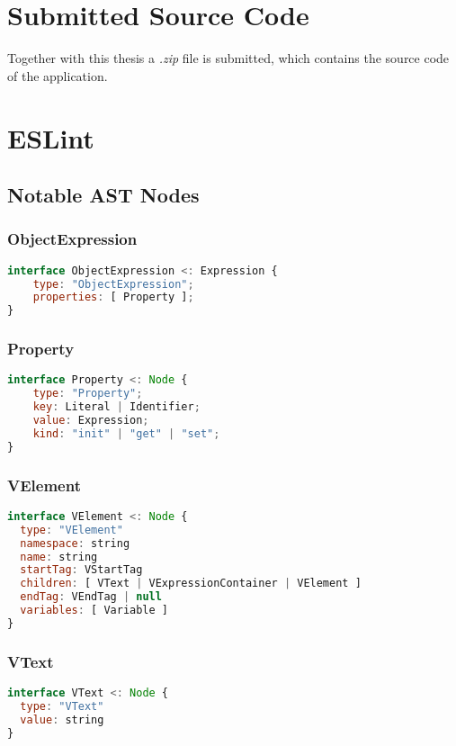 \section{Submitted Source Code}
Together with this thesis a \textit{.zip} file is submitted, which contains the source code of the application.

\section{ESLint}
\subsection{Notable AST Nodes}

\subsubsection{ObjectExpression}
\label{eslint:object_expression}
\begin{lstlisting}[language=JavaScript]
interface ObjectExpression <: Expression {
    type: "ObjectExpression";
    properties: [ Property ];
}
\end{lstlisting}

\subsubsection{Property}
\label{eslint:property}
\begin{lstlisting}[language=JavaScript]
interface Property <: Node {
    type: "Property";
    key: Literal | Identifier;
    value: Expression;
    kind: "init" | "get" | "set";
}
\end{lstlisting}

\subsubsection{VElement}
\label{eslint:velement}
\begin{lstlisting}[language=JavaScript]
interface VElement <: Node {
  type: "VElement"
  namespace: string
  name: string
  startTag: VStartTag
  children: [ VText | VExpressionContainer | VElement ]
  endTag: VEndTag | null
  variables: [ Variable ]
}
\end{lstlisting}

\subsubsection{VText}
\label{eslint:vtext}
\begin{lstlisting}[language=JavaScript]
interface VText <: Node {
  type: "VText"
  value: string
}
\end{lstlisting}

